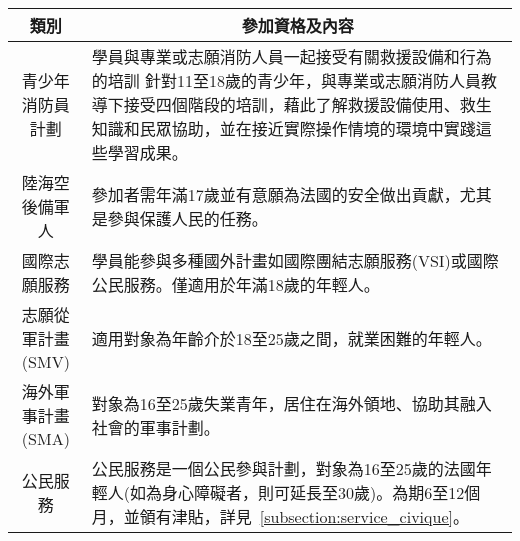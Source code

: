 \documentclass[a4paper,14pt]{extarticle}
\theoremstyle{plain}
\theoremstyle{remark}
\numberwithin{equation}{section}
\begin{document}
\begin{center}
  \begin{tabularx}{\textwidth}{ | c | X |}
	\hline
  \textbf{類別} &  \multicolumn{1}{c|}{\textbf{參加資格及內容}}
	\\ \hline
	青少年消防員計劃 & 
	學員與專業或志願消防人員一起接受有關救援設備和行為的培訓
    針對11至18歲的青少年，與專業或志願消防人員教導下接受四個階段的培訓，藉此了解救援設備使用、救生知識和民眾協助，並在接近實際操作情境的環境中實踐這些學習成果。
	\\ \hline
	陸海空後備軍人 & 參加者需年滿17歲並有意願為法國的安全做出貢獻，尤其是參與保護人民的任務。
	\\ \hline
	國際志願服務  %
			  & 
			  學員能參與多種國外計畫如國際團結志願服務(VSI)或國際公民服務。僅適用於年滿18歲的年輕人。
	\\ \hline
	志願從軍計畫(SMV) 
			  &     適用對象為年齡介於18至25歲之間，就業困難的年輕人。
	\\ \hline
	海外軍事計畫(SMA)
			  & 
       對象為16至25歲失業青年，居住在海外領地、協助其融入社會的軍事計劃。
	\\ \hline
	公民服務 %
			  &
        公民服務是一個公民參與計劃，對象為16至25歲的法國年輕人(如為身心障礙者，則可延長至30歲)。為期6至12個月，並領有津貼，詳見~\ref{subsection:service_civique}。

\end{tabularx}
\end{center}
\end{document}
